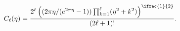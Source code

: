 \[\mathop{C_{\ell}\/}\nolimits\!\left(\eta\right)=\dfrac{2^{\ell}\left((2\pi\eta%
/(e^{2\pi\eta}-1))\prod_{k=1}^{\ell}(\eta^{2}+k^{2})\right)^{\ifrac{1}{2}}}{(2%
\ell+1)!}.\]